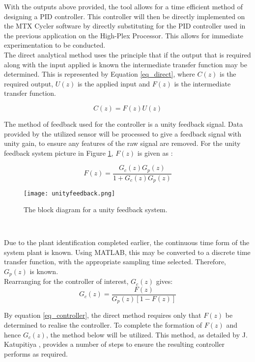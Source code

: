 With the outputs above provided, the tool allows for a time efficient method of designing a PID controller. This controller will then be directly implemented on the MTX Cycler software by directly substituting for the PID controller used in the previous application on the High-Plex Processor. This allows for immediate experimentation to be conducted.\\

The direct analytical method uses the principle that if the output that is required along with the input applied is known the intermediate transfer function may be determined. This is represented by Equation \ref{eq_direct}, where $C(z)$ is the required output, $U(z)$ is the applied input and $F(z)$ is the intermediate transfer function.

\begin{equation}
\label{eq_direct}
C(z) = F(z)U(z)
\end{equation}

The method of feedback used for the controller is a unity feedback signal. Data provided by the utilized sensor will be processed to give a feedback signal with unity gain, to ensure any features of the raw signal are removed. For the unity feedback system picture in Figure \ref{fig:unityfeedback}, $F(z)$ is given as \cite{UNSW}:

\begin{equation}
F(z) = \frac{G_c(z)G_p(z)}{1+G_c(z)G_p(z)}
\end{equation}

\begin{figure}[!htb]
	\centering
	\texttt{[image: unityfeedback.png]}
	\caption[Unity feedback system.]{The block diagram for a unity feedback system. \cite{UNSW}}
	\label{fig:unityfeedback}
\end{figure} 
\FloatBarrier

Due to the plant identification completed earlier, the continuous time form of the system plant is known. Using MATLAB, this may be converted to a discrete time transfer function, with the appropriate sampling time selected. Therefore, $G_p(z)$ is known.\\

Rearranging for the controller of interest, $G_c(z)$ gives:
\begin{equation}
\label{eq_controller}
G_c(z) = \frac{F(z)}{G_p(z)[1-F(z)]}
\end{equation}

By equation \ref{eq_controller}, the direct method requires only that $F(z)$ be determined to realise the controller. To complete the formation of $F(z)$ and hence $G_c(z)$, the method below will be utilized. This method, as detailed by J. Katupitiya \cite{UNSW}, provides a number of steps to ensure the resulting controller performs as required.\\

